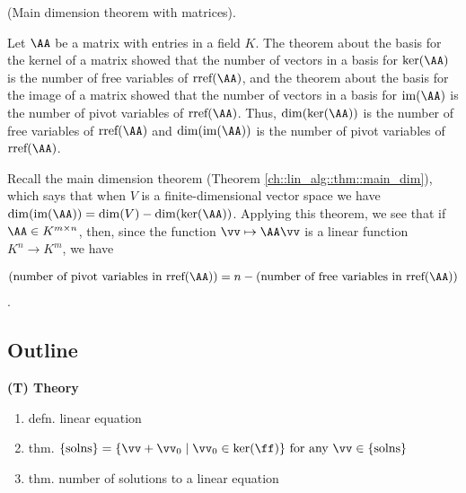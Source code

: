 \begin{deriv}
    (Main dimension theorem with matrices).

    Let $\AA$ be a matrix with entries in a field $K$. The theorem about the basis for the kernel of a matrix showed that the number of vectors in a basis for $\ker(\AA)$ is the number of free variables of $\rref(\AA)$, and the theorem about the basis for the image of a matrix showed that the number of vectors in a basis for $\im(\AA)$ is the number of pivot variables of $\rref(\AA)$. Thus, $\dim(\ker(\AA))$ is the number of free variables of $\rref(\AA)$ and $\dim(\im(\AA))$ is the number of pivot variables of $\rref(\AA)$.
    
    Recall the main dimension theorem (Theorem \ref{ch::lin_alg::thm::main_dim}), which says that when $V$ is a finite-dimensional vector space we have $\dim(\im(\AA)) = \dim(V) - \dim(\ker(\AA))$. Applying this theorem, we see that if $\AA \in K^{m \times n}$, then, since the function $\vv \mapsto \AA \vv$ is a linear function $K^n \rightarrow K^m$, we have

    \begin{align*}
        (\text{number of pivot variables in $\rref(\AA)$}) = n - (\text{number of free variables in $\rref(\AA)$})
    \end{align*}.
\end{deriv}

\newpage

\subsection*{Outline}

\textbf{(T) Theory}
\begin{enumerate}
    \item defn. linear equation
    \item thm. $\{\text{solns}\} = \{ \vv + \vv_0 \mid \vv_0 \in \ker(\ff) \} \text{ for any $\vv \in \{\text{solns}\}$}$
    \item thm. number of solutions to a linear equation
\end{enumerate}

